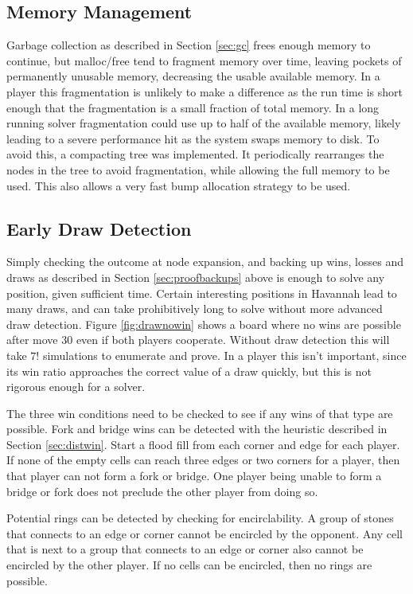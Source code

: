 \subsection{Memory Management}

Garbage collection as described in Section \ref{sec:gc} frees enough memory to continue, but malloc/free tend to fragment memory over time, leaving pockets of permanently unusable memory, decreasing the usable available memory. In a player this fragmentation is unlikely to make a difference as the run time is short enough that the fragmentation is a small fraction of total memory. In a long running solver fragmentation could use up to half of the available memory, likely leading to a severe performance hit as the system swaps memory to disk. To avoid this, a compacting tree was implemented. It periodically rearranges the nodes in the tree to avoid fragmentation, while allowing the full memory to be used. This also allows a very fast bump allocation strategy to be used.


\subsection{Early Draw Detection}

Simply checking the outcome at node expansion, and backing up wins, losses and draws as described in Section \ref{sec:proofbackups} above is enough to solve any position, given sufficient time. Certain interesting positions in Havannah lead to many draws, and can take prohibitively long to solve without more advanced draw detection. Figure \ref{fig:drawnowin} shows a board where no wins are possible after move 30 even if both players cooperate. Without draw detection this will take $7!$ simulations to enumerate and prove. In a player this isn't important, since its win ratio approaches the correct value of a draw quickly, but this is not rigorous enough for a solver.

The three win conditions need to be checked to see if any wins of that type are possible. Fork and bridge wins can be detected with the heuristic described in Section \ref{sec:distwin}. Start a flood fill from each corner and edge for each player. If none of the empty cells can reach three edges or two corners for a player, then that player can not form a fork or bridge. One player being unable to form a bridge or fork does not preclude the other player from doing so.

Potential rings can be detected by checking for encirclability. A group of stones that connects to an edge or corner cannot be encircled by the opponent. Any cell that is next to a group that connects to an edge or corner also cannot be encircled by the other player. If no cells can be encircled, then no rings are possible.

